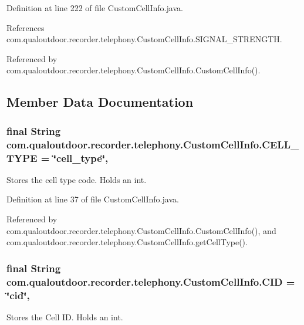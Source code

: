 Definition at line 222 of file Custom\-Cell\-Info.\-java.



References com.\-qualoutdoor.\-recorder.\-telephony.\-Custom\-Cell\-Info.\-S\-I\-G\-N\-A\-L\-\_\-\-S\-T\-R\-E\-N\-G\-T\-H.



Referenced by com.\-qualoutdoor.\-recorder.\-telephony.\-Custom\-Cell\-Info.\-Custom\-Cell\-Info().



\subsection{Member Data Documentation}
\hypertarget{classcom_1_1qualoutdoor_1_1recorder_1_1telephony_1_1CustomCellInfo_a638ed63a0341e0753ca2c8b12ceae1bd}{
\subsubsection[{C\-E\-L\-L\-\_\-\-T\-Y\-P\-E}]{\setlength{\rightskip}{0pt plus 5cm}final String com.\-qualoutdoor.\-recorder.\-telephony.\-Custom\-Cell\-Info.\-C\-E\-L\-L\-\_\-\-T\-Y\-P\-E = \char`\"{}cell\-\_\-type\char`\"{}\hspace{0.3cm}{\ttfamily [static]}, {\ttfamily [private]}}}\label{classcom_1_1qualoutdoor_1_1recorder_1_1telephony_1_1CustomCellInfo_a638ed63a0341e0753ca2c8b12ceae1bd}
Stores the cell type code. Holds an int. 

Definition at line 37 of file Custom\-Cell\-Info.\-java.



Referenced by com.\-qualoutdoor.\-recorder.\-telephony.\-Custom\-Cell\-Info.\-Custom\-Cell\-Info(), and com.\-qualoutdoor.\-recorder.\-telephony.\-Custom\-Cell\-Info.\-get\-Cell\-Type().

\hypertarget{classcom_1_1qualoutdoor_1_1recorder_1_1telephony_1_1CustomCellInfo_a75a77bb9f669b3a1aa876a28d304515c}{
\subsubsection[{C\-I\-D}]{\setlength{\rightskip}{0pt plus 5cm}final String com.\-qualoutdoor.\-recorder.\-telephony.\-Custom\-Cell\-Info.\-C\-I\-D = \char`\"{}cid\char`\"{}\hspace{0.3cm}{\ttfamily [static]}, {\ttfamily [private]}}}\label{classcom_1_1qualoutdoor_1_1recorder_1_1telephony_1_1CustomCellInfo_a75a77bb9f669b3a1aa876a28d304515c}
Stores the Cell I\-D. Holds an int. 

